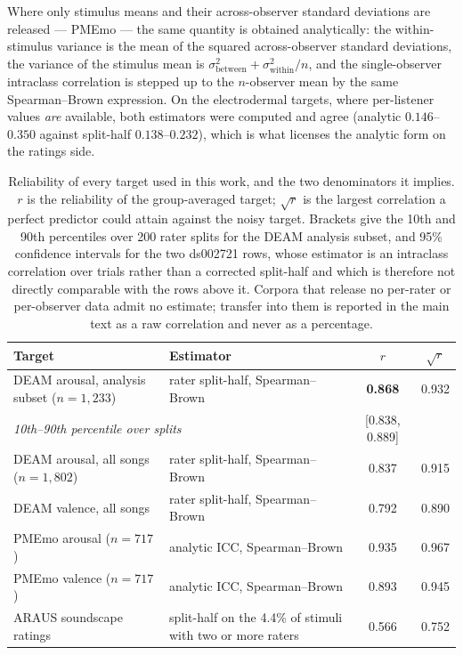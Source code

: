 Where only stimulus means and their across-observer standard deviations are released
--- PMEmo --- the same quantity is obtained analytically: the within-stimulus variance
is the mean of the squared across-observer standard deviations, the variance of the
stimulus mean is $\sigma^2_{\mathrm{between}} + \sigma^2_{\mathrm{within}}/n$, and the
single-observer intraclass correlation is stepped up to the $n$-observer mean by the
same Spearman--Brown expression. On the electrodermal targets, where per-listener
values \emph{are} available, both estimators were computed and agree
(analytic $0.146$--$0.350$ against split-half $0.138$--$0.232$), which is what
licenses the analytic form on the ratings side.

\begin{table}[htbp]
\centering\small
\caption{Reliability of every target used in this work, and the two denominators it
implies. $r$ is the reliability of the group-averaged target; $\sqrt{r}$ is the
largest correlation a perfect predictor could attain against the noisy target.
Brackets give the 10th and 90th percentiles over 200 rater splits for the DEAM
analysis subset, and 95\% confidence intervals for the two ds002721 rows, whose
estimator is an
intraclass correlation over trials rather than a corrected split-half and which is
therefore not directly comparable with the rows above it. Corpora that release no
per-rater or per-observer data admit no estimate; transfer into them is reported in
the main text as a raw correlation and never as a percentage.}
\begin{tabular}{p{5.2cm}p{4.4cm}cc}
\toprule
Target & Estimator & $r$ & $\sqrt{r}$ \\
\midrule
DEAM arousal, analysis subset ($n = 1{,}233$) & rater split-half, Spearman--Brown
  & \textbf{0.868} & 0.932 \\
\multicolumn{2}{l}{\quad \emph{10th--90th percentile over splits}}
  & [0.838, 0.889] & \\
DEAM arousal, all songs ($n = 1{,}802$) & rater split-half, Spearman--Brown
  & 0.837 & 0.915 \\
DEAM valence, all songs & rater split-half, Spearman--Brown & 0.792 & 0.890 \\
PMEmo arousal ($n = 717$) & analytic ICC, Spearman--Brown & 0.935 & 0.967 \\
PMEmo valence ($n = 717$) & analytic ICC, Spearman--Brown & 0.893 & 0.945 \\
ARAUS soundscape ratings & split-half on the 4.4\% of stimuli with two or more
  raters & 0.566 & 0.752 \\

\end{tabular}
\end{table}
